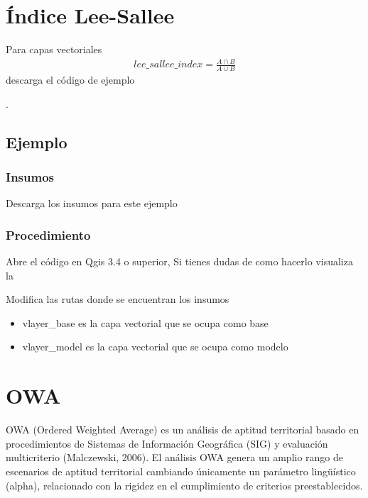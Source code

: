 \documentclass[letterpaper,10pt,spanish]{sphinxmanual}
\begin{document}
\chapter{Índice Lee-Sallee}
\label{\detokenize{leesallee:indice-lee-sallee}}\label{\detokenize{leesallee::doc}}
Para capas vectoriales
\begin{equation*}
\begin{split}lee\_sallee\_index =  \frac{A\cap B}{A\cup B}\end{split}
\end{equation*}
descarga el código de ejemplo

.


\section{Ejemplo}
\label{\detokenize{leesallee:ejemplo}}

\subsection{Insumos}
\label{\detokenize{leesallee:insumos}}
Descarga los insumos para este ejemplo 


\subsection{Procedimiento}
\label{\detokenize{leesallee:procedimiento}}
Abre el código  en Qgis 3.4 o superior,
Si tienes dudas de como hacerlo visualiza la 

Modifica las rutas donde se encuentran los insumos
\begin{itemize}
\item {} 
vlayer\_base es la capa vectorial que se ocupa como base

\item {} 
vlayer\_model es la capa vectorial que se ocupa como modelo

\end{itemize}

\noindent{}


\chapter{OWA}
\label{\detokenize{owa:owa}}\label{\detokenize{owa::doc}}
OWA (Ordered Weighted Average) es un análisis de aptitud territorial basado en procedimientos de
Sistemas de Información Geográfica (SIG) y evaluación multicriterio (Malczewski, 2006).
El análisis OWA genera un amplio rango de escenarios de aptitud territorial cambiando únicamente un
parámetro lingüístico (alpha), relacionado con la rigidez en el cumplimiento de criterios preestablecidos.
\end{document}

